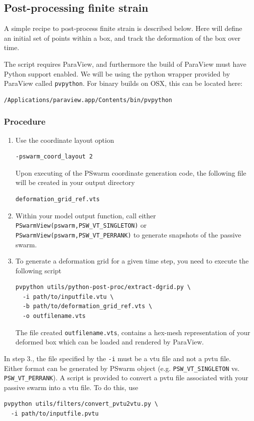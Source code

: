 \documentclass[paper=a4, fontsize=10pt,twoside]{scrartcl}
\begin{document}
{{\subsection{Post-processing finite strain}
A simple recipe to post-process finite strain is described below.
Here will define an initial set of points within a box, and track the deformation of the box over time.

The script requires ParaView, and furthermore the build of ParaView must have Python support enabled.
We will be using the python wrapper provided by ParaView called {\tt pvpython}.
For binary builds on OSX, this can be located here:
\begin{lstlisting}
/Applications/paraview.app/Contents/bin/pvpython
\end{lstlisting}

\subsubsection*{Procedure}
\begin{enumerate}

\item Use the coordinate layout option
\begin{lstlisting}
-pswarm_coord_layout 2
\end{lstlisting}
Upon executing of the PSwarm coordinate generation code, the following file will be created in your output directory
\begin{lstlisting}
deformation_grid_ref.vts
\end{lstlisting}

\item Within your model output function, call either
\texttt{PSwarmView(pswarm,PSW\_VT\_SINGLETON)}
or
\texttt{PSwarmView(pswarm,PSW\_VT\_PERRANK)}
to generate snapshots of the passive swarm.

\item To generate a deformation grid for a given time step, you need to execute the following script
\begin{lstlisting}
pvpython utils/python-post-proc/extract-dgrid.py \
  -i path/to/inputfile.vtu \
  -b path/to/deformation_grid_ref.vts \
  -o outfilename.vts
\end{lstlisting}
The file created {\tt outfilename.vts}, contains a hex-mesh representation of your deformed box which can be loaded and rendered by ParaView.
\end{enumerate}

In step 3., the file specified by the \texttt{-i} must be a vtu file and not a pvtu file.
Either format can be generated by PSwarm object (e.g. \texttt{PSW\_VT\_SINGLETON} vs. \texttt{PSW\_VT\_PERRANK}).
A script is provided to convert a pvtu file associated with your passive swarm into a vtu file.
To do this, use
\begin{lstlisting}
pvpython utils/filters/convert_pvtu2vtu.py \
  -i path/to/inputfile.pvtu
\end{lstlisting}

}}
\end{document}
